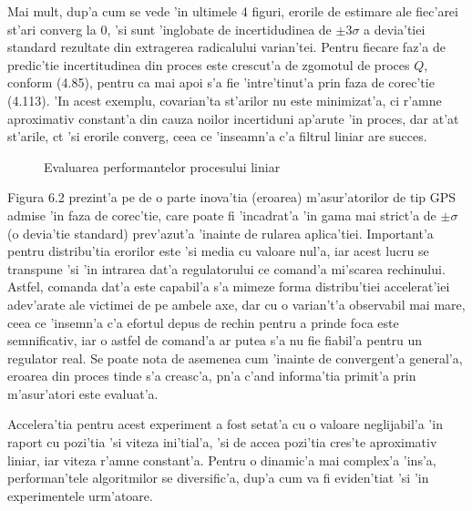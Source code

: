 \documentclass[12pt,a4paper,twoside]{report}
\begin{document}
\vspace{5px}

Mai mult, dup'a cum se vede 'in ultimele 4 figuri, erorile de estimare ale fiec'arei st'ari converg la 0, 'si sunt 'inglobate de incertidudinea de $\pm 3 \sigma$ a devia'tiei standard rezultate din extragerea radicalului varian'tei. Pentru fiecare faz'a de predic'tie incertitudinea din proces este crescut'a de zgomotul de proces $Q$, conform (4.85), pentru ca mai apoi s'a fie 'intre'tinut'a prin faza de corec'tie (4.113). 'In acest exemplu, covarian'ta st'arilor nu este minimizat'a, ci r'am\ia ne aproximativ constant'a din cauza noilor incertiduni ap'arute 'in proces, dar at'at st'arile, c\ia t 'si erorile converg, ceea ce 'inseamn'a c'a filtrul liniar are succes. 

\begin{figure}[h]
\hspace*{-4cm}
 
 \caption{Evaluarea performantelor procesului liniar}
\end{figure}

Figura 6.2 prezint'a pe de o parte inova'tia (eroarea) m'asur'atorilor de tip GPS admise 'in faza de corec'tie, care poate fi 'incadrat'a 'in gama mai strict'a de $\pm \sigma$ (o devia'tie standard) prev'azut'a 'inainte de rularea aplica'tiei. Important'a pentru distribu'tia erorilor este 'si media cu valoare nul'a, iar acest lucru se transpune 'si 'in intrarea dat'a regulatorului ce comand'a mi'scarea rechinului. Astfel, comanda dat'a este capabil'a s'a mimeze forma distribu'tiei accelerat'iei adev'arate ale victimei de pe ambele axe, dar cu o varian't'a observabil mai mare, ceea ce 'insemn'a c'a efortul depus de rechin pentru a prinde foca este semnificativ, iar o astfel de comand'a ar putea s'a nu fie fiabil'a pentru un regulator real. Se poate nota de asemenea cum 'inainte de convergent'a general'a, eroarea din proces tinde s'a creasc'a, p\ia n'a c'and informa'tia primit'a prin m'asur'atori este evaluat'a.

\vspace{5px}

Accelera'tia pentru acest experiment a fost setat'a cu o valoare neglijabil'a 'in raport cu pozi'tia 'si viteza ini'tial'a, 'si de accea pozi'tia cres'te aproximativ liniar, iar viteza r'am\ia ne constant'a. Pentru o dinamic'a mai complex'a 'ins'a, performan'tele algoritmilor se diversific'a, dup'a cum va fi eviden'tiat 'si 'in experimentele urm'atoare.
\end{document}
